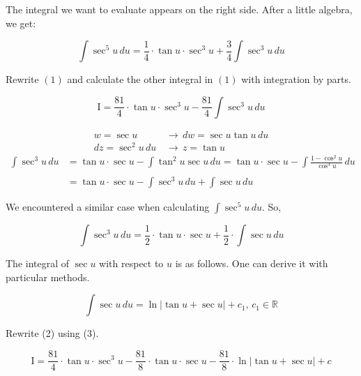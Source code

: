 \documentclass{article}
\begin{document}
\hfill

\noindent The integral we want to evaluate appears on the right side. After a little algebra, we get:

\begin{equation*}
\int\sec^5u \,du = \frac 14\cdot\tan u\cdot\sec^3 u + \frac 34\int\sec^3u\,du
\end{equation*}

\hfill

\noindent Rewrite $(1)$ and calculate the other integral in $(1)$ with integration by parts.

\begin{equation}
\mathrm{I} = \frac{81}4\cdot\tan u\cdot\sec^3 u - \frac {81}4\int\sec^3u\,du
\end{equation}

\begin{align*}
    w=\sec u\,&\rightarrow\, dw = \sec u\tan u \,du\\
    dz=\sec^2u\,du\,&\rightarrow\, z = \tan u
\end{align*}
\begin{align*}
\int\sec^3u\,du&=\tan u \cdot \sec u -\int \tan^2 u\sec u\, du = \tan u \cdot \sec u -\int \frac{1-\cos^2u}{\cos^3 u}\, du\\\\&= \tan u \cdot \sec u - \int \sec^3u \, du + \int \sec u \, du 
\end{align*}

\hfill

\noindent We encountered a similar case when calculating $\displaystyle \int\sec^5 u \, du$. So,

\begin{equation*}
\int\sec^3u\,du= \frac12\cdot\tan u \cdot\sec u + \frac12\cdot\int \sec u\,du
\end{equation*}

\hfill

\noindent The integral of $\sec u$ with respect to $u$ is as follows. One can derive it with particular methods.

\begin{equation}\int\sec u \, du = \ln|\tan u + \sec u| + c_1,\,c_1\in\mathbb{R}
\end{equation}

\hfill

\noindent Rewrite (2) using (3).

\begin{equation*}
\mathrm{I} = \frac{81}4\cdot\tan u\cdot\sec^3 u -\frac{81}{8} \cdot\tan u \cdot\sec u-\frac{81}{8}\cdot\ln|\tan u + \sec u| + c
\end{equation*}
\end{document}
